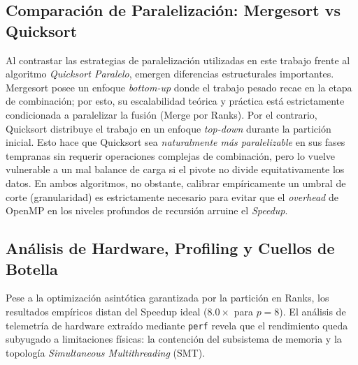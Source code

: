 \documentclass[12pt, a4paper]{article}
\begin{document}
\subsection{Comparación de Paralelización: Mergesort vs Quicksort}
Al contrastar las estrategias de paralelización utilizadas en este trabajo frente al algoritmo \textit{Quicksort Paralelo}, emergen diferencias estructurales importantes. Mergesort posee un enfoque \textit{bottom-up} donde el trabajo pesado recae en la etapa de combinación; por esto, su escalabilidad teórica y práctica está estrictamente condicionada a paralelizar la fusión (Merge por Ranks). 
Por el contrario, Quicksort distribuye el trabajo en un enfoque \textit{top-down} durante la partición inicial. 
Esto hace que Quicksort sea \textit{naturalmente más paralelizable} en sus fases tempranas sin requerir operaciones complejas de combinación, pero lo vuelve vulnerable a un mal balance de carga si el pivote no divide equitativamente los datos. 
En ambos algoritmos, no obstante, calibrar empíricamente un umbral de corte (granularidad) es estrictamente necesario para evitar que el 
\textit{overhead} de OpenMP en los niveles profundos de recursión arruine el \textit{Speedup}.

\subsection{Análisis de Hardware, Profiling y Cuellos de Botella}
\begin{table}[H]
    \centering
    \small \caption{Métricas de hardware capturadas con \texttt{perf} para la carga máxima ($N = 2^{26}$) ejecutando con 8 hilos (vs Secuencial a 1 hilo).}
    \label{tab:hardware_metrics}
\end{table}
Pese a la optimización asintótica garantizada por la partición en Ranks, los resultados empíricos distan del Speedup ideal ($8.0\times$ para $p=8$). 
El análisis de telemetría de hardware extraído mediante \texttt{perf} revela que el rendimiento queda subyugado a limitaciones físicas: la contención del subsistema de memoria y la topología \textit{Simultaneous Multithreading} (SMT).
\end{document}
